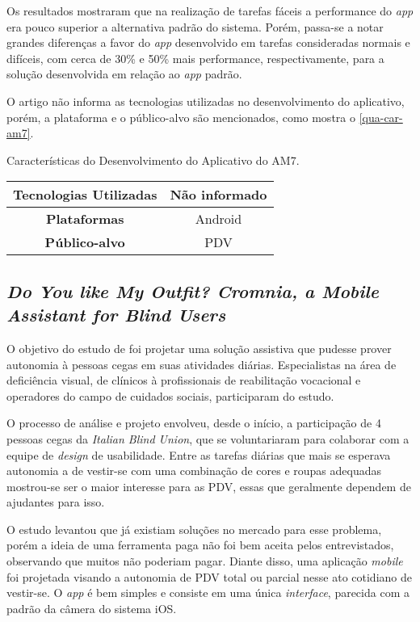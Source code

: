 Os resultados mostraram que na realização de tarefas fáceis a performance do \emph{app} era pouco superior a alternativa padrão do sistema.
Porém, passa-se a notar grandes diferenças a favor do \emph{app} desenvolvido em tarefas consideradas normais e difíceis, com cerca de 30\% e 50\% mais performance, respectivamente, para a solução desenvolvida em relação ao \emph{app} padrão.

O artigo não informa as tecnologias utilizadas no desenvolvimento do aplicativo, porém, a plataforma e o público-alvo são
mencionados, como mostra o \autoref{qua-car-am7}.

\begin{quadro}[htb!]
  \caption{\label{qua-car-am7}Características do Desenvolvimento do Aplicativo do AM7.}
  \begin{tabular}{|c|c|}
    \hline
    \textbf{Tecnologias Utilizadas} & Não informado \\ \hline
    \textbf{Plataformas}            & Android       \\ \hline
    \textbf{Público-alvo}           & PDV           \\
    \hline
  \end{tabular}
\end{quadro}

\subsection{\emph{Do You like My Outfit? Cromnia, a Mobile Assistant for Blind Users}}

O objetivo do estudo de  foi projetar uma solução assistiva que pudesse prover autonomia à pessoas cegas em suas atividades diárias.
Especialistas na área de deficiência visual, de clínicos à profissionais de reabilitação vocacional e operadores do campo de cuidados sociais, participaram do estudo.

O processo de análise e projeto envolveu, desde o início, a participação de 4 pessoas cegas da \emph{Italian Blind Union}, que se voluntariaram para colaborar com a equipe de \emph{design} de usabilidade.
Entre as tarefas diárias que mais se esperava autonomia a de vestir-se com uma combinação de cores e roupas adequadas mostrou-se ser o maior interesse para as PDV, essas que geralmente dependem de ajudantes para isso.

O estudo levantou que já existiam soluções no mercado para esse problema, porém a ideia de uma ferramenta paga não foi bem aceita
pelos entrevistados, observando que muitos não poderiam pagar.
Diante disso, uma aplicação \emph{mobile} foi projetada visando a autonomia de PDV total ou parcial nesse ato cotidiano de vestir-se.
O \emph{app} é bem simples e consiste em uma única \emph{interface}, parecida com a padrão da câmera do sistema iOS\@.

